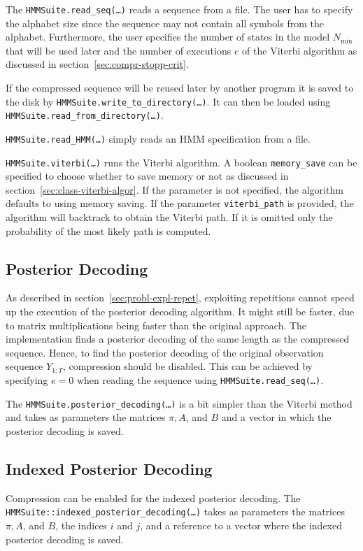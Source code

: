 The \texttt{HMMSuite.read\_seq(\dots)} reads a sequence from a file. The user
has to specify the alphabet size since the sequence may not contain all
symbols from the alphabet. Furthermore, the user specifies the number of states
in the model $N_{\min}$ that will be used later and the number of executions
$e$ of the Viterbi algorithm as discussed in
section~\ref{sec:compr-stopp-crit}.

If the compressed sequence will be reused later by another program it is saved
to the disk by \texttt{HMMSuite.write\_to\_directory(\dots)}. It can then be
loaded using \texttt{HMMSuite.read\_from\_directory(\dots)}.

\texttt{HMMSuite.read\_HMM(\dots)} simply reads an HMM specification from a
file.

\texttt{HMMSuite.viterbi(\dots)} runs the Viterbi algorithm. A boolean
\texttt{memory\_save} can be specified to choose whether to save memory or not
as discussed in section~\ref{sec:class-viterbi-algor}. If the parameter is not
specified, the algorithm defaults to using memory saving. If the parameter
\texttt{viterbi\_path} is provided, the algorithm will backtrack to obtain the
Viterbi path. If it is omitted only the probability of the most likely path is
computed.

\subsection{Posterior Decoding}

As described in section~\ref{sec:probl-expl-repet}, exploiting repetitions
cannot speed up the execution of the posterior decoding algorithm. It might still
be faster, due to matrix multiplications being faster than the original
approach. The implementation finds a posterior decoding of the same length as
the compressed sequence. Hence, to find the posterior decoding of the original
observation sequence $Y_{1:T}$, compression should be disabled. This can be achieved by
specifying $e = 0$ when reading the sequence using
\texttt{HMMSuite.read\_seq(\dots)}.

The \texttt{HMMSuite.posterior\_decoding(\dots)} is a bit simpler than the
Viterbi method and takes as parameters the matrices $\pi, A$, and $B$ and a
vector in which the posterior decoding is saved.

\subsection{Indexed Posterior Decoding}

Compression can be enabled for the indexed posterior decoding. The
\texttt{HMMSuite::indexed\_posterior\_decoding(\dots)} takes as parameters the
matrices $\pi, A$, and $B$, the indices $i$ and $j$, and a reference to a vector
where the indexed posterior decoding is saved.

